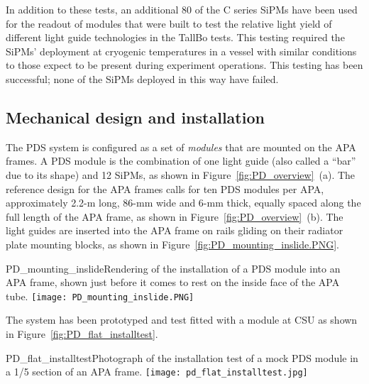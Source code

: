 

In addition to these tests, an additional 80 of the C series SiPMs have been used for the
readout of modules that were built to test the relative light yield of
different light guide technologies in the TallBo tests.  %
This testing 
required the SiPMs' deployment at cryogenic temperatures in a vessel with 
similar conditions to those expect to be present during experiment operations. 
This testing has been successful; none of the SiPMs deployed in this way have failed.

\subsection{Mechanical design and installation}

The PDS system is configured as a set of \textit{modules} that are mounted on the APA frames.  A PDS module is
the combination of one light guide (also called a ``bar'' due to its
shape) and 12 SiPMs, as shown in Figure~\ref{fig:PD_overview}~(a).  %
The reference design for the APA frames calls for ten PDS modules per APA, approximately 2.2-m long,
86-mm wide and 6-mm thick, equally spaced along the full length of the
APA frame, as shown in Figure~\ref{fig:PD_overview}~(b). 
The light guides are inserted into the APA frame on rails gliding on their radiator
plate mounting blocks, as shown in Figure~\ref{fig:PD_mounting_inslide.PNG}.

\begin{cdrfigure}
  {PD_mounting_inslide}{Rendering of the installation of a PDS module
    into an APA frame, shown just before it comes to rest on the inside face
    of the APA tube.}
\texttt{[image: PD\_mounting\_inslide.PNG]}
\end{cdrfigure}

The system has been prototyped and test fitted with a module at CSU 
as shown in Figure~\ref{fig:PD_flat_installtest}.
\begin{cdrfigure}
  {PD_flat_installtest}{Photograph of the installation
    test of a mock PDS module in a 1/5 section of an APA frame.}
\texttt{[image: pd\_flat\_installtest.jpg]}
\end{cdrfigure}

